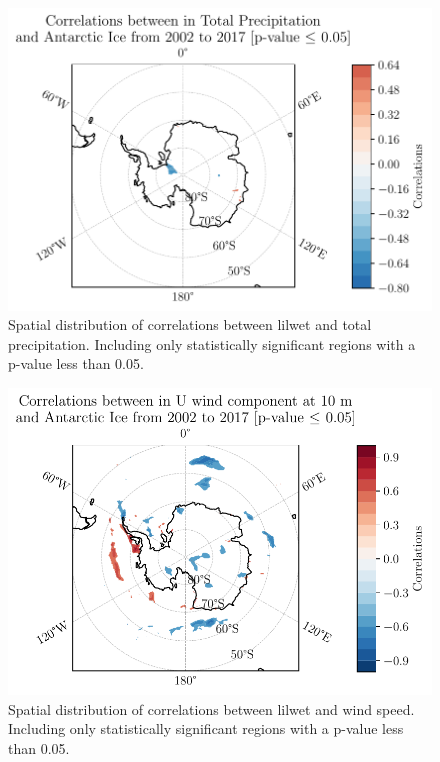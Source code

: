 \documentclass[../main.tex]{subfiles}
\begin{document}
\begin{figure}[hbt!]
    \centering
    \includegraphics{images/2021w5/chapter7/hres/correlation_spatial_tp}
    \caption{Spatial distribution of correlations between \gls{lilwet} and total precipitation. Including only statistically significant regions with a p-value less than 0.05.}
    \label{fig:my_label}
\end{figure}
\begin{figure}[hbt!]
    \centering
    \includegraphics{images/2021w5/chapter7/hres/correlation_spatial_u_10}
    \caption{Spatial distribution of correlations between \gls{lilwet} and wind speed. Including only statistically significant regions with a p-value less than 0.05.}
    \label{fig:my_label}
\end{figure}
\end{document}
